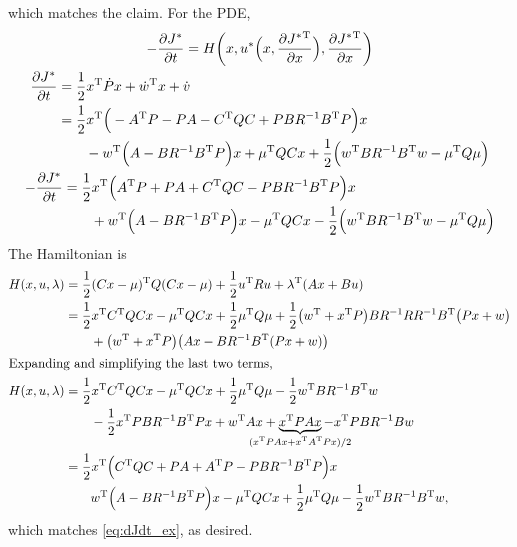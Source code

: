 which matches the claim. For the PDE,
\begin{gather}
  -\frac{\partial J^*}{\partial t} = H\bigg( x, u^*\Big(x,\frac{\partial J^*{}^\text{T}}{\partial x}\Big), \frac{\partial J^*{}^\text{T}}{\partial x} \bigg) \\
  \begin{aligned}
    \frac{\partial J^*}{\partial t} &= \frac12 x^\text{T} \dot P x + \dot w^\text{T} x + \dot v \\
    &= \frac12 x^\text{T} \Big( -A^\text{T} P - PA - C^\text{T} Q C + PBR^{-1}B^\text{T} P \Big) x \\
    & \qquad {} - w^\text{T} \Big( A - BR^{-1}B^\text{T} P \Big) x + \mu^\text{T} QCx + \frac12 \Big( w^\text{T} BR^{-1}B^\text{T} w - \mu^\text{T} Q\mu \Big) \\
  \end{aligned} \\
  \begin{aligned}
    -\frac{\partial J^*}{\partial t} &= \frac12 x^\text{T} \Big( A^\text{T} P + PA + C^\text{T} Q C - PBR^{-1}B^\text{T} P \Big) x \\
    & \qquad {} + w^\text{T} \Big( A - BR^{-1}B^\text{T} P \Big) x - \mu^\text{T} QCx - \frac12 \Big( w^\text{T} BR^{-1}B^\text{T} w - \mu^\text{T} Q\mu \Big) \\
  \end{aligned} \label{eq:dJdt_ex}
\end{gather}
The Hamiltonian is
\begin{align}
  H(x,u,\lambda) &= \frac12 (Cx-\mu)\trans Q(Cx-\mu) + \frac12 u\trans Ru + \lambda\trans (Ax + Bu) \\
                 &= \frac12 x\trans C\trans QCx - \mu\trans QCx + \frac12 \mu\trans Q\mu + \frac12 \big(w\trans + x\trans P\big) BR^{-1}RR^{-1}B\trans \big(Px + w\big) \\
                 & \qquad {} + \big(w\trans + x\trans P\big) \big( Ax - BR^{-1}B\trans (Px + w)\big) \\
  \intertext{Expanding and simplifying the last two terms,}
  H(x,u,\lambda) &= \frac12 x\trans C\trans QCx - \mu\trans QCx + \frac12 \mu\trans Q\mu - \frac12 w\trans BR^{-1}B\trans w \\
                 & \qquad {} - \frac12 x\trans PBR^{-1}B\trans Px + w\trans Ax + \underbrace{x\trans PAx}_{\mathclap{(x\trans PAx + x\trans A\trans Px)/2}} - x\trans PBR^{-1}Bw \\
                 &= \frac12 x\trans \Big( C\trans QC + PA + A\trans P - PBR^{-1}B\trans P \Big) x \\
                 & \qquad {} w\trans \Big( A - BR^{-1}B\trans P \Big) x - \mu\trans QCx + \frac12 \mu\trans Q\mu - \frac12 w\trans BR^{-1}B\trans w,
\end{align}
which matches \eqref{eq:dJdt_ex}, as desired.

